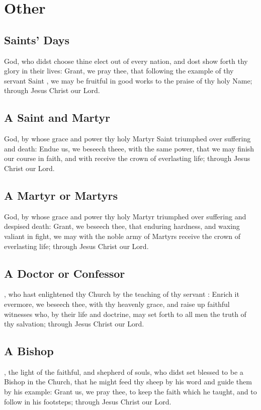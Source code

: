 \section{Other}

\subsection{Saints' Days}
 God, who didst choose thine elect out of every nation, and dost show forth thy glory in their lives: Grant, we pray thee, that following the example of thy servant Saint , we may be fruitful in good works to the praise of thy holy Name; through Jesus Christ our Lord.

\subsection{A Saint and Martyr}
 God, by whose grace and power thy holy Martyr Saint  triumphed over suffering and death: Endue us, we beseech theee, with the same power, that we may finish our course in faith, and with  receive the crown of everlasting life; through Jesus Christ our Lord.

\subsection{A Martyr or Martyrs}
 God, by whose grace and power thy holy Martyr  triumphed over suffering and despised death: Grant, we beseech thee, that enduring hardness, and waxing valiant in fight, we may with the noble army of Martyrs receive the crown of everlasting life; through Jesus Christ our Lord.

\subsection{A Doctor or Confessor}
, who hast enlightened thy Church by the teaching of thy servant : Enrich it evermore, we beseech thee, with thy heavenly grace, and raise up faithful witnesses who, by their life and doctrine, may set forth to all men the truth of thy salvation; through Jesus Christ our Lord.

\subsection{A Bishop}
, the light of the faithful, and shepherd of souls, who didst set blessed  to be a Bishop in the Church, that he might feed thy sheep by his word and guide them by his example: Grant us, we pray thee, to keep the faith which he taught, and to follow in his footsteps; through Jesus Christ our Lord.

